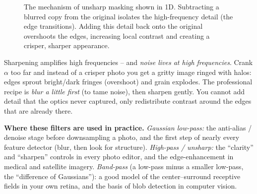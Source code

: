 \begin{figure}[H]
\centering
{}
\caption{The mechanism of unsharp masking shown in 1D. Subtracting a blurred copy from the original isolates the high-frequency detail (the edge transitions). Adding this detail back onto the original overshoots the edges, increasing local contrast and creating a crisper, sharper appearance.}
\label{ch31:fig-unsharp}
\end{figure}

\begin{trapbox}
Sharpening amplifies high frequencies -- and \emph{noise lives at high
frequencies}. Crank $\alpha$ too far and instead of a crisper photo you get a
gritty image ringed with halos: edges sprout bright/dark fringes (overshoot) and grain
explodes. The professional recipe is \emph{blur a little first} (to tame noise),
then sharpen gently. You cannot add detail that the optics
never captured, only redistribute contrast around the edges that are already there.
\end{trapbox}

\begin{applicationbox}
\textbf{Where these filters are used in practice.}
\emph{Gaussian low-pass:} the anti-alias / denoise stage before downsampling a
photo, and the first step of nearly every feature detector (blur, then look for
structure). \emph{High-pass / unsharp:} the ``clarity'' and ``sharpen'' controls
in every photo editor, and the edge-enhancement in medical and satellite imagery.
\emph{Band-pass} (a low-pass minus a smaller low-pass, the ``difference of
Gaussians''): a good model of the center--surround receptive fields in
your own retina, and the basis of blob detection in computer vision.
\end{applicationbox}


